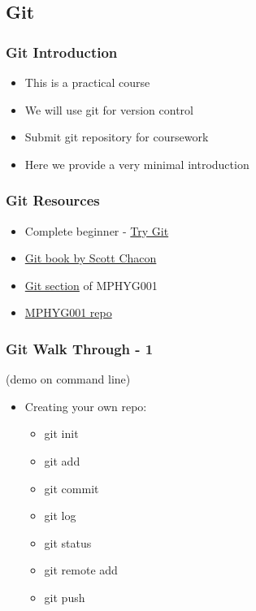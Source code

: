 \hypertarget{git}{%
\subsection{Git}\label{git}}

\hypertarget{git-introduction}{%
\subsubsection{Git Introduction}\label{git-introduction}}

\begin{itemize}
\tightlist
\item
  This is a practical course
\item
  We will use git for version control
\item
  Submit git repository for coursework
\item
  Here we provide a very minimal introduction
\end{itemize}

\hypertarget{git-resources}{%
\subsubsection{Git Resources}\label{git-resources}}

\begin{itemize}
\tightlist
\item
  Complete beginner - \href{https://try.github.io}{Try Git}
\item
  \href{https://git-scm.com/book/en/v2}{Git book by Scott Chacon}
\item
  \href{http://github-pages.ucl.ac.uk/rsd-engineeringcourse/ch02git/}{Git
  section} of MPHYG001
\item
  \href{https://github.com/UCL/rsd-engineeringcourse}{MPHYG001 repo}
\end{itemize}

\hypertarget{git-walk-through---1}{%
\subsubsection{Git Walk Through - 1}\label{git-walk-through---1}}

(demo on command line)

\begin{itemize}
\tightlist
\item
  Creating your own repo:

  \begin{itemize}
  \tightlist
  \item
    git init
  \item
    git add
  \item
    git commit
  \item
    git log
  \item
    git status
  \item
    git remote add
  \item
    git push
  \end{itemize}
\end{itemize}


